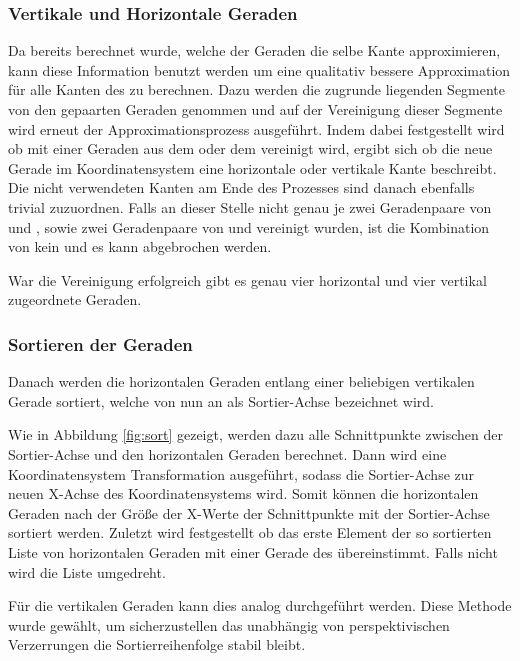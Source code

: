 \subsubsection{Vertikale und Horizontale Geraden}
Da bereits berechnet wurde, welche der Geraden die selbe Kante approximieren, kann diese Information benutzt werden um eine qualitativ bessere Approximation für alle Kanten des \olfp zu berechnen. Dazu werden die zugrunde liegenden Segmente von den gepaarten Geraden genommen und auf der Vereinigung dieser Segmente wird erneut der Approximationsprozess ausgeführt. Indem dabei festgestellt wird ob mit einer Geraden aus dem \orfp oder dem \ulfp vereinigt wird, ergibt sich ob die neue Gerade im \QRCode Koordinatensystem eine horizontale oder vertikale Kante beschreibt. Die nicht verwendeten Kanten am Ende des Prozesses sind danach ebenfalls trivial zuzuordnen. Falls an dieser Stelle nicht genau je zwei Geradenpaare von \olfp und \orfp, sowie zwei Geradenpaare von \olfp und \orfp vereinigt wurden, ist die Kombination von \fps kein \QRCode und es kann abgebrochen werden.

War die Vereinigung erfolgreich gibt es genau vier horizontal und vier vertikal zugeordnete Geraden.

\subsubsection{Sortieren der Geraden}
Danach werden die horizontalen Geraden entlang einer beliebigen vertikalen Gerade sortiert, welche von nun an als Sortier-Achse bezeichnet wird. 

Wie in Abbildung \ref{fig:sort} gezeigt, werden dazu alle Schnittpunkte zwischen der Sortier-Achse und den horizontalen Geraden berechnet. Dann wird eine Koordinatensystem Transformation ausgeführt, sodass die Sortier-Achse zur neuen X-Achse des Koordinatensystems wird. Somit können die horizontalen Geraden nach der Größe der X-Werte der Schnittpunkte mit der Sortier-Achse sortiert werden. Zuletzt wird festgestellt ob das erste Element der so sortierten Liste von horizontalen Geraden mit einer Gerade des \olfp übereinstimmt. Falls nicht wird die Liste umgedreht.

Für die vertikalen Geraden kann dies analog durchgeführt werden. Diese Methode wurde gewählt, um sicherzustellen das unabhängig von perspektivischen Verzerrungen die Sortierreihenfolge stabil bleibt.

